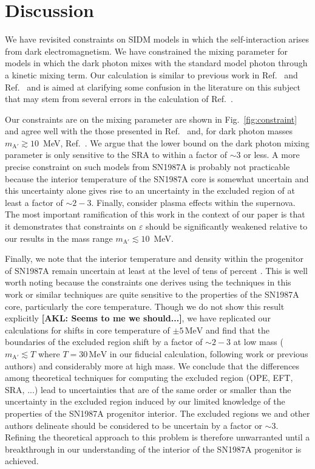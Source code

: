 \documentclass[nofootinbib,prd,superscriptaddress,twocolumn]{revtex4}
\newcommand{\akl}[1]{{{\bf{\color{Blue}[AKL: #1]}}}}
\begin{document}
\section{Discussion}
\label{section:conclusions}


We have revisited constraints on SIDM models in which the 
self-interaction arises from dark electromagnetism. We have 
constrained the mixing parameter for models in which the dark photon 
mixes with the standard model photon through a kinetic mixing term. Our calculation 
is similar to previous work in Ref.~\cite{dent_etal12} and Ref.~\cite{rrapaj_reddy16} and 
is aimed at clarifying some confusion in the literature on this subject that may stem 
from several errors in the calculation of Ref.~\cite{dent_etal12}.

Our constraints are on the mixing parameter are shown in 
Fig.~\ref{fig:constraint} and agree well with the those presented in 
Ref.~\cite{rrapaj_reddy16} and, for dark photon masses $m_{\mathrm{A}'} \gtrsim 10$~MeV, 
Ref.~\cite{hardy_lasenby17}. We argue that the lower bound on the dark photon mixing parameter 
is only sensitive to the SRA to within a factor of $\sim 3$ or less. A more precise constraint 
on such models from SN1987A is probably not practicable because the interior temperature 
of the SN1987A core is somewhat uncertain and this uncertainty alone gives rise to an uncertainty 
in the excluded region of at least a factor of $\sim 2-3$. Finally, \citet{hardy_lasenby17} consider 
plasma effects within the supernova. The most important ramification of this work in the context of 
our paper is that it demonstrates that constraints on $\varepsilon$ should be significantly weakened 
relative to our results in the mass range $m_{\mathrm{A}'} \lesssim 10$~MeV.

Finally, we note that the interior temperature and density within the progenitor of SN1987A remain 
uncertain at least at the level of tens of percent \citep[e.g.][]{perego15,farmer16}. This is well worth 
noting because the constraints one derives using the techniques in this work or similar techniques 
are quite sensitive to the properties of the SN1987A core, particularly the core temperature. Though 
we do not show this result explicitly \akl{Seems to me we should...}, we have replicated our calculations for shifts in core temperature 
of $\pm 5\, \mathrm{MeV}$ and find that the boundaries of the excluded region shift by a factor of $\sim 2-3$ at low 
mass ($m_{\mathrm{A}'} \lesssim T$ where $T = 30\, \mathrm{MeV}$ in our fiducial calculation, following 
work or previous authors) and considerably more at high mass. 
We conclude that the differences among theoretical techniques for 
computing the excluded region (OPE, EFT, SRA, ...) lead to uncertainties that are of the same order or 
smaller than the uncertainty in the excluded region induced by our limited knowledge of the 
properties of the SN1987A progenitor interior. The excluded regions we and other authors delineate 
should be considered to be uncertain by a factor or $\sim 3$. Refining the theoretical approach to this 
problem is therefore unwarranted until a breakthrough in our understanding of the interior of the 
SN1987A progenitor is achieved.
\end{document}
